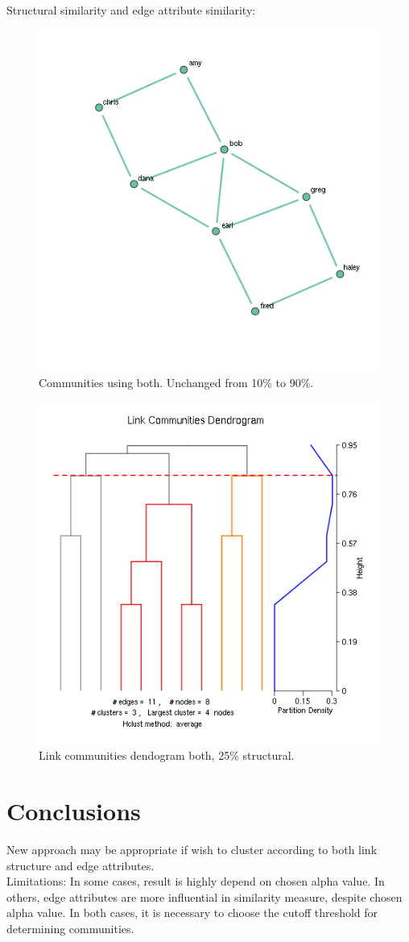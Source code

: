 \documentclass{report}
\begin{document}
Structural similarity and edge attribute similarity:


\begin{figure}[htp!]
  \centering
  \includegraphics[width=0.65\linewidth]{toy3/ea/edge_comm_0.25.png}
  \caption{Communities using both. Unchanged from 10\% to 90\%.}
\end{figure}

\begin{figure}[htp!]
  \centering
  \includegraphics[width=0.65\linewidth]{toy3/no_ea/lc.png}
  \caption{Link communities dendogram both, 25\% structural.}
\end{figure}

\section*{Conclusions}

New approach may be appropriate if wish to cluster according to both link structure and edge attributes.\\

Limitations: In some cases, result is highly depend on chosen alpha value. In others, edge attributes are more influential in similarity measure, despite chosen alpha value. In both cases, it is necessary to choose the cutoff threshold for determining communities.

\nocite{DBLP:journals/corr/abs-1201-6568}
\nocite{ahn-lehmann-link-communities-nature-2010}
\nocite{Salem:2013:MMF:2500863.2500869}



\end{document}
